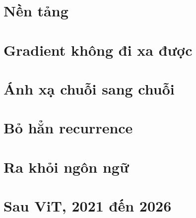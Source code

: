 \documentclass[11pt,a4paper,twoside,openright]{book}
\begin{document}
\frontmatter


\tableofcontents


\mainmatter

\part{Nền tảng}


\part{Gradient không đi xa được}




\part{Ánh xạ chuỗi sang chuỗi}



\part{Bỏ hẳn recurrence}




\part{Ra khỏi ngôn ngữ}



\part{Sau ViT, 2021 đến 2026}






\appendix







\backmatter
\printbibliography[heading=bibintoc]
\printindex
\end{document}
